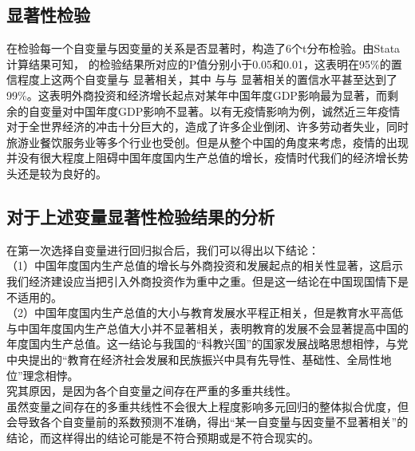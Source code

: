 \documentclass[UTF8]{article}
\begin{document}
	\subsection{显著性检验}
	在检验每一个自变量与因变量的关系是否显著时，构造了6个t分布检验。由Stata计算结果可知， 的检验结果所对应的P值分别小于0.05和0.01，这表明在95\%的置信程度上这两个自变量与 显著相关，其中 与与 显著相关的置信水平甚至达到了99\%。这表明外商投资和经济增长起点对某年中国年度GDP影响最为显著，而剩余的自变量对中国年度GDP影响不显著。以有无疫情影响为例，诚然近三年疫情对于全世界经济的冲击十分巨大的，造成了许多企业倒闭、许多劳动者失业，同时旅游业餐饮服务业等多个行业也受创。但是从整个中国的角度来考虑，疫情的出现并没有很大程度上阻碍中国年度国内生产总值的增长，疫情时代我们的经济增长势头还是较为良好的。
	\subsection{对于上述变量显著性检验结果的分析}
	在第一次选择自变量进行回归拟合后，我们可以得出以下结论：
	\\\indent
	（1）中国年度国内生产总值的增长与外商投资和发展起点的相关性显著，这启示我们经济建设应当把引入外商投资作为重中之重。但是这一结论在中国现国情下是不适用的。
	\\\indent
	（2）中国年度国内生产总值的大小与教育发展水平程正相关，但是教育水平高低与中国年度国内生产总值大小并不显著相关，表明教育的发展不会显著提高中国的年度国内生产总值。这一结论与我国的“科教兴国”的国家发展战略思想相悖，与党中央提出的“教育在经济社会发展和民族振兴中具有先导性、基础性、全局性地位”理念相悖。
	\\\indent
	究其原因，是因为各个自变量之间存在严重的多重共线性。
	\\\indent
	虽然变量之间存在的多重共线性不会很大上程度影响多元回归的整体拟合优度，但会导致各个自变量前的系数预测不准确，得出“某一自变量与因变量不显著相关”的结论，而这样得出的结论可能是不符合预期或是不符合现实的。
\end{document}
